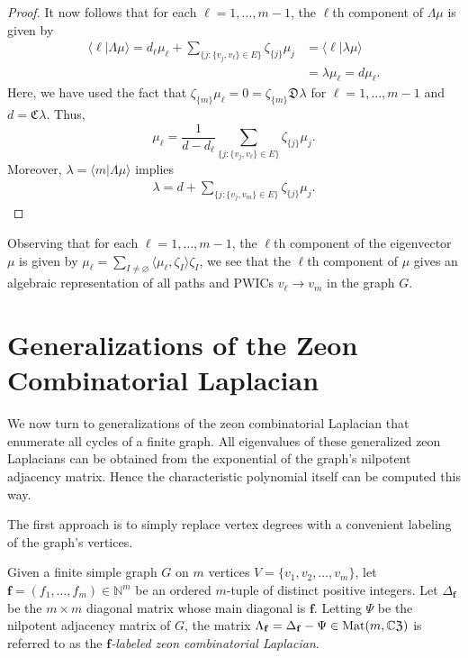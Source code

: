 \documentclass{article}
\theoremstyle{definition}
\newcommand{\zco}{\mathfrak{C}\mspace{1mu}}
\newcommand{\zdu}{\mathfrak{D}\mspace{1mu}}
\newcommand{\CZ}{\mathbb{C}\mathfrak{Z}}
\newcommand{\Mat}{{\rm Mat}}
\numberwithin{equation}{section}
\begin{document}
\begin{proof}
It now follows that for each $\ell=1, \ldots, m-1$, the $\ell$th component of $\Lambda \mu$ is given by 
\begin{align*}
\langle \ell\vert \Lambda \mu\rangle=d_\ell\mu_\ell+\sum_{\{j: \{v_j,v_\ell\}\in E\}}\zeta_{\{j\}}\mu_j&=\langle \ell\vert\lambda \mu\rangle\\
&=\lambda \mu_\ell=d\mu_\ell.
\end{align*}
Here, we have used the fact that $\zeta_{\{m\}}\mu_\ell=0=\zeta_{\{m\}}\zdu\lambda$ for $\ell=1, \ldots, m-1$ and $d=\zco\lambda$.  Thus,
\begin{equation*}
\mu_\ell=\frac{1}{d-d_\ell}\sum_{\{j: \{v_j,v_\ell\}\in E\}}\zeta_{\{j\}}\mu_j.
\end{equation*}
Moreover, $\lambda=\langle m\vert\Lambda \mu\rangle$ implies \begin{align*}
\lambda=d+\sum_{\{j: \{v_j,v_m\}\in E\}}\zeta_{\{j\}}\mu_j.
\end{align*}
\end{proof}

Observing that for each $\ell=1, \ldots, m-1$, the $\ell$th component of the eigenvector $\mu$ is given by $\mu_\ell=\displaystyle\sum_{I\ne\varnothing}\langle \mu_\ell, \zeta_I\rangle\zeta_I$,  we see that the $\ell$th component of $\mu$ gives an algebraic representation of all paths and PWICs $v_\ell\to v_m$ in the graph $G$.


\section{Generalizations of the Zeon Combinatorial Laplacian}\label{generalizations}

We now turn to generalizations of the zeon combinatorial Laplacian that enumerate all cycles of a finite graph.  All eigenvalues of these generalized zeon Laplacians can be obtained from the exponential of the graph's nilpotent adjacency matrix.  Hence the characteristic polynomial itself can be computed this way.
 
The first approach is to simply replace vertex degrees with a convenient labeling of the graph's vertices.  

Given a finite simple graph $G$ on $m$ vertices $V=\{v_1, v_2, \ldots, v_m\}$, let $\mathbf{f}=(f_1, \ldots, f_m)\in\mathbb{N}^m$ be an ordered $m$-tuple of distinct positive integers.   Let $\Delta_{\mathbf{f}}$ be the $m\times m$ diagonal matrix whose main diagonal is $\mathbf{f}$.  Letting $\Psi$ be the nilpotent adjacency matrix of $G$, the matrix $\Lambda_{\mathbf{f}}=\Delta_{\mathbf{f}}-\Psi\in\Mat(m,\CZ)$ is referred to as the {\em $\mathbf{f}$-labeled zeon combinatorial Laplacian}. 
\end{document}
